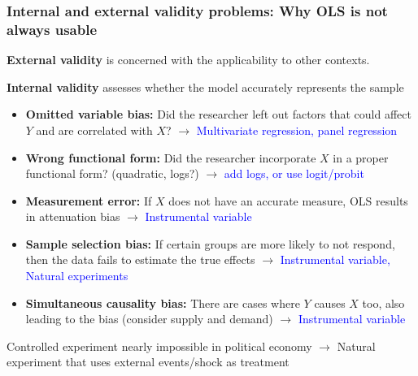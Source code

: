 \documentclass[aspectratio=169]{beamer}
\newenvironment{wideitemize}{\itemize\addtolength{\itemsep}{10pt}}{\enditemize}
\begin{document}
\begin{frame}
\frametitle{Internal and external validity problems: Why OLS is not always usable} 
\begin{wideitemize}
\item \textbf{External validity} is concerned with the applicability to other contexts.  \medskip
\item \textbf{Internal validity} assesses whether the model accurately represents the sample
\begin{itemize}
\item \textbf{Omitted variable bias: } Did the researcher left out factors that could affect $Y$ and are correlated with $X$?  $\to$ \textcolor{blue}{Multivariate regression, panel regression}
\item \textbf{Wrong functional form: } Did the researcher incorporate $X$ in a proper functional form? (quadratic, logs?) $\to$ \textcolor{blue}{add logs, or use logit/probit}
\item \textbf{Measurement error: } If $X$ does not have an accurate measure, OLS results in attenuation bias   $\to$ \textcolor{blue}{Instrumental variable}
\item \textbf{Sample selection bias: }  If certain groups are more likely to not respond, then the data fails to estimate the true effects $\to$ \textcolor{blue}{Instrumental variable, Natural experiments} 
\item \textbf{Simultaneous causality bias: } There are cases where $Y$ causes $X$ too, also leading to the bias (consider supply and demand) $\to$ \textcolor{blue}{Instrumental variable}
\end{itemize}
\item Controlled experiment nearly impossible in political economy $\to$ Natural experiment that uses external events/shock as treatment
\end{wideitemize}
\end{frame}
\end{document}
